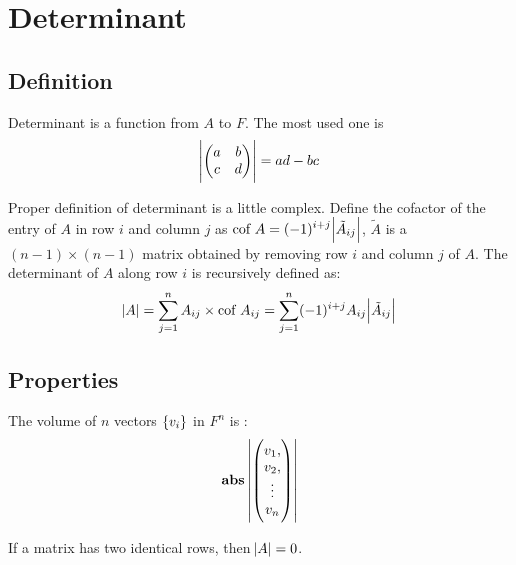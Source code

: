 \section{Determinant}


\subsection{Definition}

Determinant is a function from $A$ to $F$. The most used one is 
\begin{equation}
    \abs{\begin{pmatrix}
        a & b \\
        c & d
    \end{pmatrix}} = ad - bc
\end{equation}


Proper definition of determinant is a little complex. Define the cofactor of the entry of $A$ in row $i$ and column $j$ as $\displaystyle \text{cof} ~\displaystyle A = (-1)^{i+j} \abs{\tilde{A}_{ij}}$, $\tilde{A}$ is a $(n-1)\times (n-1)$ matrix obtained by removing row $i$ and column $j$ of $A$. The determinant of $A$ along row $i$ is recursively defined as:
\begin{equation}
    \abs{A} = \sum_{j=1}^n A_{ij} \times \displaystyle \text{cof} ~\displaystyle A_{ij} = \sum_{j=1}^n (-1)^{i+j} A_{ij}  \abs{\tilde{A}_{ij}}
\end{equation}


\subsection{Properties}

\begin{theorem}
    The volume of $n$ vectors $\set{v_i}$ in $F^n$ is :
    \begin{equation}
\mathbf{abs\ } {\abs{\begin{pmatrix}
            v_1,\\
            v_2,\\
            \vdots \\
            v_n
        \end{pmatrix}}}
    \end{equation}
\end{theorem}


\begin{theorem}
    If a matrix has two identical rows, then $\abs{A} = 0$.
\end{theorem}


